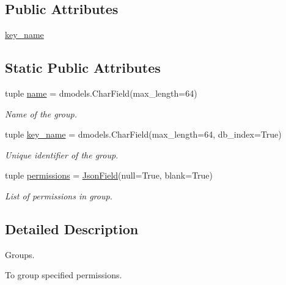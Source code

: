 \subsection*{Public Attributes}
\begin{DoxyCompactItemize}
\item 
\hyperlink{classcore_1_1models_1_1Group_a0e455bf93e8ef057105e84940632e65e}{key\-\_\-name}
\end{DoxyCompactItemize}
\subsection*{Static Public Attributes}
\begin{DoxyCompactItemize}
\item 
tuple \hyperlink{classcore_1_1models_1_1Group_a4cdd32a2664af27834735b341b78422a}{name} = dmodels.\-Char\-Field(max\-\_\-length=64)
\begin{DoxyCompactList}\small\item\em Name of the group. \end{DoxyCompactList}\item 
tuple \hyperlink{classcore_1_1models_1_1Group_a0e455bf93e8ef057105e84940632e65e}{key\-\_\-name} = dmodels.\-Char\-Field(max\-\_\-length=64, db\-\_\-index=True)
\begin{DoxyCompactList}\small\item\em Unique identifier of the group. \end{DoxyCompactList}\item 
tuple \hyperlink{classcore_1_1models_1_1Group_af6dd4a8383b686c8eb65fdb5310983a6}{permissions} = \hyperlink{classcore_1_1fields_1_1JsonField}{Json\-Field}(null=True, blank=True)
\begin{DoxyCompactList}\small\item\em List of permissions in group. \end{DoxyCompactList}\end{DoxyCompactItemize}


\subsection{Detailed Description}
Groups. 

To group specified permissions. 


